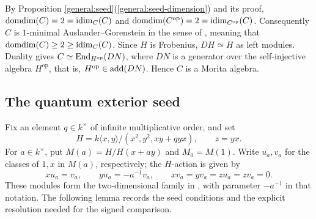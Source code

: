 \documentclass[11pt]{article}
\begin{document}
\begin{Rem}
By Proposition \ref{general:seed}\textup{(\ref{general:seed-dimension})} and its proof, $\operatorname{domdim}(C)=2={\rm idim}_C(C)$ and $\operatorname{domdim}(C^{\mathrm{op}})=2={\rm idim}_{C^{\mathrm{op}}}(C)$. Consequently $C$ is $1$-minimal Auslander--Gorenstein in the sense of \cite[Definition~1.1]{IS}, meaning that $\operatorname{domdim}(C)\ge2\ge{\rm idim}_C(C)$. Since $H$ is Frobenius, $DH\simeq H$ as left modules.
Duality gives $C\simeq{\rm End}_{H^{\mathrm{op}}}(DN)$, where $DN$ is a generator over the
self-injective algebra $H^{\mathrm{op}}$, that is, $H^{\mathrm{op}}\in{\rm add}(DN)$.
Hence $C$ is a Morita algebra.
\end{Rem}

\subsection{The quantum exterior seed}
\label{seed:concrete-pair}

Fix an element $q\in k^\times$ of infinite multiplicative order, and set
\begin{equation*}
 H=k\langle x,y\rangle/(x^2,y^2,xy+qyx),\qquad z=yx.
\end{equation*}
For $a\in k^\times$, put $M(a)=H/H(x+ay)$ and $M_0=M(1)$.
Write $u_a,v_a$ for the classes of $1,x$ in $M(a)$, respectively;
the $H$-action is given by
\begin{equation*}
 xu_a=v_a,\qquad yu_a=-a^{-1}v_a,\qquad
 xv_a=yv_a=zu_a=zv_a=0.
\end{equation*}
These modules form the two-dimensional
family in \cite[Section~4.1]{Erd}, with parameter $-a^{-1}$
in that notation.
The following lemma records the seed conditions and the explicit
resolution needed for the signed comparison.
\end{document}
